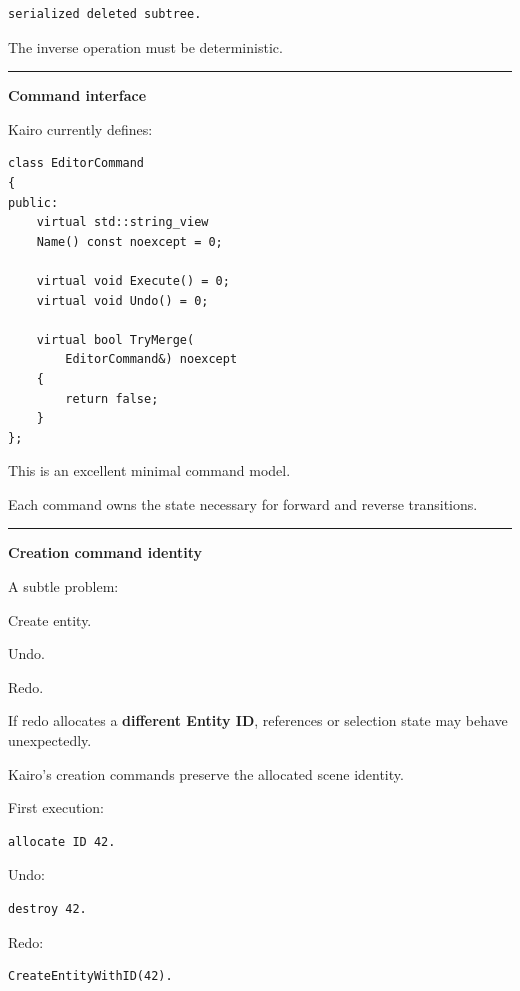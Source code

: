 \begin{verbatim}
serialized deleted subtree.
\end{verbatim}

The inverse operation must be deterministic.

\begin{center}\rule{0.5\linewidth}{0.5pt}\end{center}

\textbf{Command interface}

Kairo currently defines:

\begin{verbatim}
class EditorCommand
{
public:
    virtual std::string_view
    Name() const noexcept = 0;

    virtual void Execute() = 0;
    virtual void Undo() = 0;

    virtual bool TryMerge(
        EditorCommand&) noexcept
    {
        return false;
    }
};
\end{verbatim}

This is an excellent minimal command model.

Each command owns the state necessary for forward and reverse transitions.

\begin{center}\rule{0.5\linewidth}{0.5pt}\end{center}

\textbf{Creation command identity}

A subtle problem:

Create entity.

Undo.

Redo.

If redo allocates a \textbf{different Entity ID}, references or selection state may behave unexpectedly.

Kairo's creation commands preserve the allocated scene identity.

First execution:

\begin{verbatim}
allocate ID 42.
\end{verbatim}

Undo:

\begin{verbatim}
destroy 42.
\end{verbatim}

Redo:

\begin{verbatim}
CreateEntityWithID(42).
\end{verbatim}

